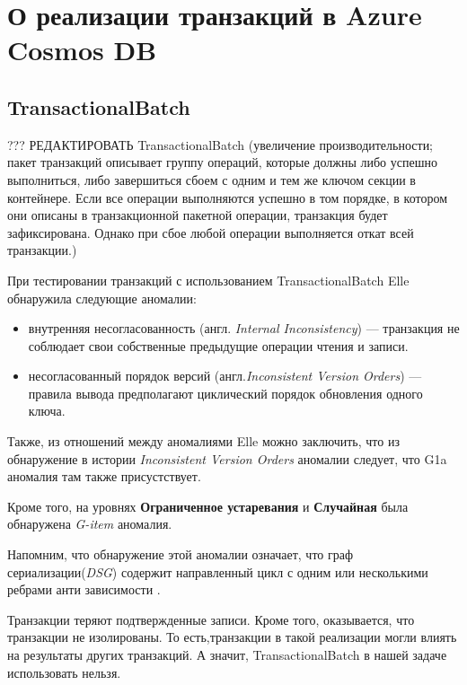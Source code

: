\documentclass[12pt,  openany]{book}
\begin{document}
\section{О реализации транзакций в Azure Cosmos DB}
\subsection{TransactionalBatch}
??? РЕДАКТИРОВАТЬ
TransactionalBatch (увеличение производительности; пакет транзакций описывает группу операций, которые должны либо успешно выполниться, либо завершиться сбоем с одним и тем же ключом секции в контейнере. Если все операции выполняются успешно в том порядке, в котором они описаны в транзакционной пакетной операции, транзакция будет зафиксирована. Однако при сбое любой операции выполняется откат всей транзакции.)

При тестировании транзакций с использованием TransactionalBatch Elle обнаружила следующие аномалии:
\begin{itemize}
\item внутренняя несогласованность (англ. \textit{Internal Inconsistency}) --- транзакция не соблюдает свои собственные предыдущие операции чтения и записи.
\item несогласованный порядок версий (англ.\textit{Inconsistent Version Orders}) --- правила вывода предполагают циклический порядок обновления одного ключа.
\end{itemize}

Также, из отношений между аномалиями Elle\cite{Kingsbury2020ElleII} можно заключить, что из обнаружение в истории  \textit{Inconsistent Version Orders} аномалии следует, что G1a аномалия там также присустствует.
\par
Кроме того, на уровнях \textbf{Ограниченное устаревания} и \textbf{Случайная} была обнаружена \textit{G-item} аномалия. 
\par
Напомним, что обнаружение этой аномалии означает, что граф сериализации(\textit{DSG}) содержит направленный цикл с одним или несколькими ребрами анти зависимости \cite{IsolationLevelDefinitions}.

Транзакции теряют подтвержденные записи.  Кроме того, оказывается, что транзакции не изолированы. То есть,транзакции в такой реализации могли влиять на результаты других транзакций.
А значит, TransactionalBatch в нашей задаче использовать нельзя.
\end{document}
